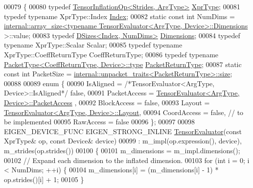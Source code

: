 \begin{DoxyCode}
00079 \{
00080   \textcolor{keyword}{typedef} \hyperlink{class_eigen_1_1_tensor_inflation_op}{TensorInflationOp<Strides, ArgType>} 
      \hyperlink{class_eigen_1_1_tensor_inflation_op}{XprType};
00081   \textcolor{keyword}{typedef} \textcolor{keyword}{typename} XprType::Index \hyperlink{namespace_eigen_a62e77e0933482dafde8fe197d9a2cfde}{Index};
00082   \textcolor{keyword}{static} \textcolor{keyword}{const} \textcolor{keywordtype}{int} NumDims = 
      \hyperlink{struct_eigen_1_1internal_1_1array__size}{internal::array\_size<typename TensorEvaluator<ArgType, Device>::Dimensions}
      >::value;
00083   \textcolor{keyword}{typedef} \hyperlink{struct_eigen_1_1_d_sizes}{DSizes<Index, NumDims>} \hyperlink{struct_eigen_1_1_d_sizes}{Dimensions};
00084   \textcolor{keyword}{typedef} \textcolor{keyword}{typename} XprType::Scalar Scalar;
00085   \textcolor{keyword}{typedef} \textcolor{keyword}{typename} XprType::CoeffReturnType CoeffReturnType;
00086   \textcolor{keyword}{typedef} \textcolor{keyword}{typename} \hyperlink{group___sparse_core___module}{PacketType<CoeffReturnType, Device>::type} 
      \hyperlink{group___sparse_core___module}{PacketReturnType};
00087   \textcolor{keyword}{static} \textcolor{keyword}{const} \textcolor{keywordtype}{int} PacketSize = 
      \hyperlink{struct_eigen_1_1internal_1_1unpacket__traits}{internal::unpacket\_traits<PacketReturnType>::size};
00088 
00089   \textcolor{keyword}{enum} \{
00090     IsAligned = \textcolor{comment}{/*TensorEvaluator<ArgType, Device>::IsAligned*/} \textcolor{keyword}{false},
00091     PacketAccess = \hyperlink{struct_eigen_1_1_tensor_evaluator}{TensorEvaluator<ArgType, Device>::PacketAccess}
      ,
00092     BlockAccess = \textcolor{keyword}{false},
00093     Layout = \hyperlink{struct_eigen_1_1_tensor_evaluator}{TensorEvaluator<ArgType, Device>::Layout},
00094     CoordAccess = \textcolor{keyword}{false},  \textcolor{comment}{// to be implemented}
00095     RawAccess = \textcolor{keyword}{false}
00096   \};
00097 
00098   EIGEN\_DEVICE\_FUNC EIGEN\_STRONG\_INLINE \hyperlink{struct_eigen_1_1_tensor_evaluator}{TensorEvaluator}(\textcolor{keyword}{const} XprType& op, \textcolor{keyword}{const} Device& 
      device)
00099       : m\_impl(op.expression(), device), m\_strides(op.strides())
00100   \{
00101     m\_dimensions = m\_impl.dimensions();
00102     \textcolor{comment}{// Expand each dimension to the inflated dimension.}
00103     \textcolor{keywordflow}{for} (\textcolor{keywordtype}{int} i = 0; i < NumDims; ++i) \{
00104       m\_dimensions[i] = (m\_dimensions[i] - 1) * op.strides()[i] + 1;
00105     \}

\end{DoxyCode}
